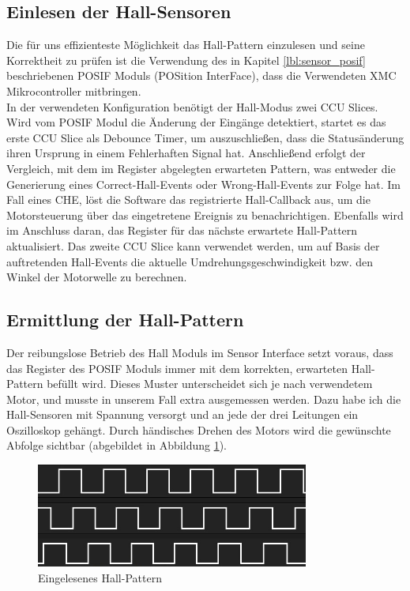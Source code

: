 \subsection{Einlesen der Hall-Sensoren}
Die für uns effizienteste Möglichkeit das Hall-Pattern einzulesen und seine Korrektheit zu prüfen ist die Verwendung des in Kapitel \ref{lbl:sensor_posif} beschriebenen POSIF Moduls (POSition InterFace), dass die Verwendeten XMC Mikrocontroller mitbringen.\\

\noindent
In der verwendeten Konfiguration benötigt der Hall-Modus zwei CCU Slices. Wird vom POSIF Modul die Änderung der Eingänge detektiert, startet es das erste CCU Slice als Debounce Timer, um auszuschließen, dass die Statusänderung ihren Ursprung in einem Fehlerhaften Signal hat. Anschließend erfolgt der Vergleich, mit dem im Register abgelegten erwarteten Pattern, was entweder die Generierung eines Correct-Hall-Events oder Wrong-Hall-Events zur Folge hat. Im Fall eines CHE, löst die Software das registrierte Hall-Callback aus, um die Motorsteuerung über das eingetretene Ereignis zu benachrichtigen. Ebenfalls wird im Anschluss daran, das Register für das nächste erwartete Hall-Pattern aktualisiert. Das zweite CCU Slice kann verwendet werden, um auf Basis der auftretenden Hall-Events die aktuelle Umdrehungsgeschwindigkeit bzw. den Winkel der Motorwelle zu berechnen.

\subsection{Ermittlung der Hall-Pattern}
Der reibungslose Betrieb des Hall Moduls im Sensor Interface setzt voraus, dass das Register des POSIF Moduls immer mit dem korrekten, erwarteten Hall-Pattern befüllt wird. Dieses Muster unterscheidet sich je nach verwendetem Motor, und musste in unserem Fall extra ausgemessen werden. Dazu habe ich die Hall-Sensoren mit Spannung versorgt und an jede der drei Leitungen ein Oszilloskop gehängt. Durch händisches Drehen des Motors wird die gewünschte Abfolge sichtbar (abgebildet in Abbildung \ref{img:hall_pattern}).

\begin{figure}[h]
\centering
\includegraphics[width=0.8\textwidth]{sensor/hall_pattern.jpg}
\caption{Eingelesenes Hall-Pattern}
\label{img:hall_pattern}
\end{figure}

